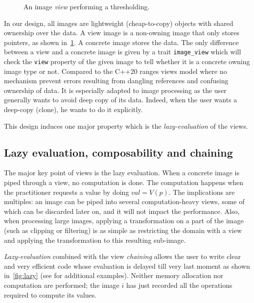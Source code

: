 \begin{figure}[htbp]
  \centering
  \begin{minipage}{\linewidth}
    
  \end{minipage}
  \caption{An image \emph{view} performing a thresholding.}
  \label{fig:view.threshold}
\end{figure}

In our design, all images are lightweight (cheap-to-copy) objects with shared ownership over the data. A view image is a
non-owning image that only stores pointers, as shown in~\cref{fig:view.threshold}. A concrete image stores the data. The
only difference between a view and a concrete image is given by a trait \texttt{image\_view} which will check the
\texttt{view} property of the given image to tell whether it is a concrete owning image type or not. Compared to the
C++20 ranges views model where no mechanism prevent errors resulting from dangling references and confusing ownership of
data. It is especially adapted to image processing as the user generally wants to avoid deep copy of its data. Indeed,
when the user wants a deep-copy (clone), he wants to do it explicitly.

This design induces one major property which is the \emph{lazy-evaluation} of the views.

\subsection{Lazy evaluation, composability and chaining}
\label{subsec:image.views.lazy.eval}

The major key point of views is the lazy evaluation. When a concrete image is piped through a view, no computation is done.
The computation happens when the practitioner requests a value by doing \(val = V(p)\). The implications are multiples:
an image can be piped into several computation-heavy views, some of which can be discarded later on, and it will not
impact the performance. Also, when processing large images, applying a transformation on a part of the image (such as
clipping or filtering) is as simple as restricting the domain with a view and applying the transformation to this
resulting sub-image.

\emph{Lazy-evaluation} combined with the view \emph{chaining} allows the user to write clear and very efficient code
whose evaluation is delayed till very last moment as shown in~\cref{fig:lazy} (see \parencite{geraud.2018.gtgdmm} for
additional examples). Neither memory allocation nor computation are performed; the image \(i\) has just recorded all the
operations required to compute its values.

